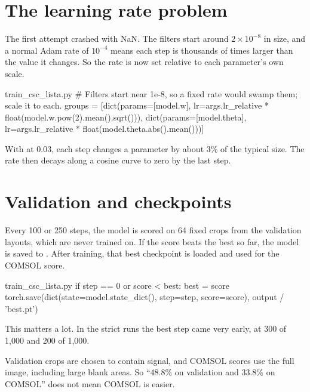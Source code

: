 \section{The learning rate problem}

The first attempt crashed with NaN. The filters start around $2\times10^{-8}$ in size, and a normal Adam
rate of $10^{-4}$ means each step is thousands of times larger than the value it changes. So the rate is now set
relative to each parameter's own scale.

\begin{code*}{train_csc_lista.py}
    # Filters start near 1e-8, so a fixed rate would swamp them; scale it to each.
    groups = [dict(params=[model.w], lr=args.lr_relative * float(model.w.pow(2).mean().sqrt())),
              dict(params=[model.theta], lr=args.lr_relative * float(model.theta.abs().mean()))]
\end{code*}

With  at 0.03, each step changes a parameter by about 3\% of the typical size. The rate then
decays along a cosine curve to zero by the last step.

\section{Validation and checkpoints}

Every 100 or 250 steps, the model is scored on 64 fixed crops from the validation layouts, which are
never trained on. If the score beats the best so far, the model is saved to . After training,
that best checkpoint is loaded and used for the COMSOL score.

\begin{code*}{train_csc_lista.py}
            if step == 0 or score < best:
                best = score
                torch.save(dict(state=model.state_dict(), step=step, score=score),
                           output / 'best.pt')
\end{code*}

This matters a lot. In the strict runs the best step came very early, at 300 of 1,000 and 200 of 1,000.

\begin{careful}
Validation crops are chosen to contain signal, and COMSOL scores use the full image, including large
blank areas. So ``48.8\% on validation and 33.8\% on COMSOL'' does not mean COMSOL is easier.
\end{careful}

